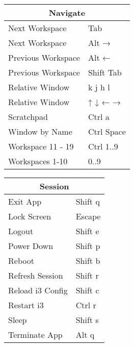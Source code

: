 \documentclass[12pt,paper=landscape,paper=a4]{scrartcl}
\begin{document}
\begin{multicols}{2}
    \begin{tabular}{ll}
         \multicolumn{2}{c}{Navigate}\\
         \hline
         Next Workspace     & \faWindows{} Tab\\
         Next Workspace     & \faWindows{} Alt →\\
         Previous Workspace & \faWindows{} Alt ←\\
         Previous Workspace & \faWindows{} Shift Tab\\
         Relative Window    & \faWindows{} k j h l\\
         Relative Window    & \faWindows{} ↑ ↓ ← →\\
         Scratchpad         & \faWindows{} Ctrl a\\
         Window by Name     & \faWindows{} Ctrl Space\\
         Workspace 11 - 19  & \faWindows{} Ctrl 1..9\\
         Workspaces 1-10    & \faWindows{} 0..9
    \end{tabular}

    \vspace{1em}

    \begin{tabular}{ll}
         \multicolumn{2}{c}{Session}\\
         \hline
         Exit App           & \faWindows{} Shift q\\
         Lock Screen        & \faWindows{} Escape\\
         Logout             & \faWindows{} Shift e\\
         Power Down         & \faWindows{} Shift p\\
         Reboot             & \faWindows{} Shift b\\
         Refresh Session    & \faWindows{} Shift r\\
         Reload i3 Config   & \faWindows{} Shift c\\
         Restart i3         & \faWindows{} Ctrl r\\
         Sleep              & \faWindows{} Shift s\\
         Terminate App      & \faWindows{} Alt q
    \end{tabular}

\end{multicols}
\end{document}
